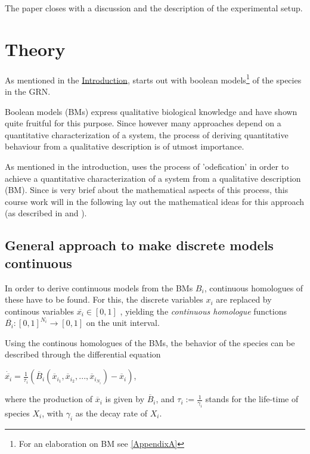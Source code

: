 \documentclass[11pt]{article}
\begin{document}
The paper closes with a discussion and the description of the experimental setup.

\section{Theory} \label{sec:Theory}
As mentioned in the \hyperref[sec:Intro]{Introduction}, \cite{Kirkham} starts out with boolean models\footnote{For an elaboration on BM see \ref{AppendixA}} of the species in the GRN. 

Boolean models (BMs) express qualitative biological knowledge and have shown quite fruitful for this purpose. Since however many approaches depend on a quantitative characterization of a system, the process of deriving quantitative behaviour from a qualitative description is of utmost importance.

As mentioned in the introduction, \cite{Kirkham} uses the process of 'odefication' in order to achieve a quantitative characterization of a system from a qualitative description (BM). Since \cite{Kirkham} is very brief about the mathematical aspects of this process, this course work will in the following lay out the mathematical ideas for this approach (as described in \cite{Wittmann} and \cite{Krumsiek}).

\subsection{General approach to make discrete models continuous} \label{ssec:prop}
In order to derive continuous models from the BMs $B_{i}$, continuous homologues of these have to be found. For this, the discrete variables $x_{i}$ are replaced by continous variables $\overline{x_{i}} \in [0, 1]$ , yielding the \textit{continuous homologue} functions $\overline{B_{i}} : [0, 1]^{N_{i}} \rightarrow [0, 1]$ on the unit interval.

Using the continous homologues of the BMs, the behavior of the species can be described through the differential equation

 $\dot{\overline{x_{i}}} = \frac{1}{\tau_{i}} (\overline{B}_{i} (\overline{x}_{i_{1}}, \overline{x}_{i_{2}},..., \overline{x}_{i_{N_{i}}}) - \overline{x}_{i})$,
 
 where the production of $\overline{x}_{i}$ is given by $\overline{B}_{i}$, and $\tau_{i} := \frac{1}{\gamma_{i}}$ stands for the life-time of species $X_{i}$, with $\gamma_{i}$ as the decay rate of $X_{i}$.
\end{document}
